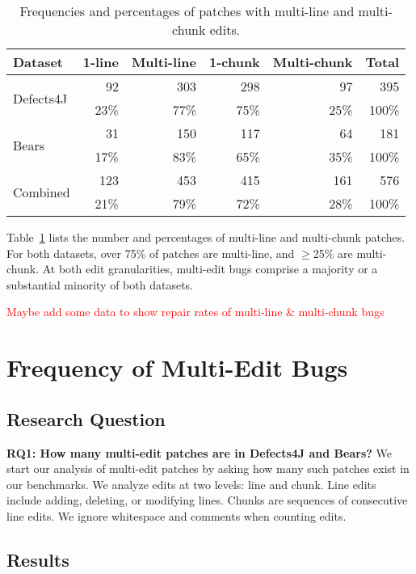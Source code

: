 \documentclass[sigconf, timestamp-false, anonymous=true]{acmart}
\newcommand\todo[1]{\textcolor{red}{#1}}
\begin{document}
\begin{table}
{\begin{center}
	\begin{tabular}{l | rrrr | r}
		\toprule
		Dataset & 1-line & Multi-line & 1-chunk & Multi-chunk & Total \\
		\midrule
		\multirow{ 2}{*}{Defects4J} & 92 & 303 & 298 & 97 & 395 \\
		& 23\% & 77\% & 75\% & 25\% & 100\% \\
		\multirow{ 2}{*}{Bears} & 31 & 150 & 117 & 64 & 181 \\
		& 17\% & 83\% & 65\% & 35\% & 100\% \\
		\midrule
		\multirow{ 2}{*}{Combined} & 123 & 453 & 415 & 161 & 576 \\
		& 21\% & 79\% & 72\% & 28\% & 100\% \\
		\bottomrule
	\end{tabular}
 \end{center}
}
	\caption{Frequencies and percentages of patches with multi-line and multi-chunk edits.}
	\label{tab:multiedit-frequencies}
\end{table}

Table~\ref{tab:multiedit-frequencies} lists the number and percentages of
multi-line and multi-chunk patches. For both datasets, over 75\% of patches are multi-line, 
and $\geq$25\% are multi-chunk. At both edit granularities, multi-edit bugs 
comprise a majority or a substantial minority of both datasets.

\todo{Maybe add some data to show repair rates of multi-line \& multi-chunk bugs}

\section{Frequency of Multi-Edit Bugs}

\subsection{Research Question}

\textbf{RQ1: How many multi-edit patches are in Defects4J and Bears?}
We start our analysis of multi-edit patches by asking how many such patches 
exist in our benchmarks. We analyze edits at two levels: line and chunk.
Line edits include adding, deleting, or modifying lines.
Chunks are sequences of consecutive line edits.
We ignore whitespace and comments when counting edits.

\subsection{Results}
\end{document}
